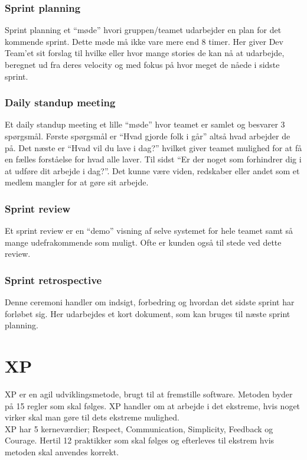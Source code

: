 \subsubsection{Sprint planning}
Sprint planning et “møde” hvori gruppen/teamet udarbejder en plan for det kommende sprint. Dette møde må ikke vare mere end 8 timer. 
Her giver Dev Team'et sit forslag til hvilke eller hvor mange stories de kan nå at udarbejde, beregnet ud fra deres velocity 
og med fokus på hvor meget de nåede i sidste sprint.

\subsubsection{Daily standup meeting}
Et daily standup meeting et lille “møde” hvor teamet er samlet og besvarer 3 spørgsmål. Første spørgsmål er “Hvad gjorde folk i går” 
altså hvad arbejder de på. Det næste er “Hvad vil du lave i dag?” hvilket giver teamet mulighed for at få en fælles 
forståelse for hvad alle laver. Til sidst “Er der noget som forhindrer dig i at udføre dit arbejde i dag?”. 
Det kunne være viden, redskaber eller andet som et medlem mangler for at gøre sit arbejde.

\subsubsection{Sprint review}
Et sprint review er en “demo” visning af selve systemet for hele teamet samt så mange udefrakommende som muligt. Ofte er kunden også til stede ved dette review.

\subsubsection{Sprint retrospective}
Denne ceremoni handler om indsigt, forbedring og hvordan det sidste sprint har forløbet sig. Her udarbejdes et kort dokument, som kan bruges til næste sprint planning.

\section{XP}\label{sec:xp}
XP er en agil udviklingsmetode, brugt til at fremstille software. Metoden byder på 15 regler som skal følges. XP handler om at arbejde i det ekstreme, 
hvis noget virker skal man gøre til dets ekstreme mulighed.  \\

XP har 5 kerneværdier; Respect, Communication, Simplicity, Feedback og Courage. Hertil 12 praktikker som 
skal følges og efterleves til ekstrem hvis metoden skal anvendes korrekt. \\

